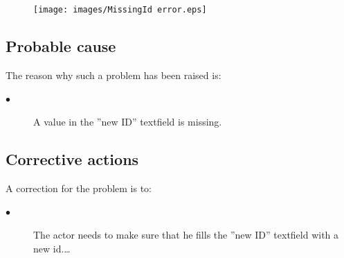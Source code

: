 \begin{figure}[H]
\centering
\texttt{[image: images/MissingId error.eps]}
\caption{\label{overflow}}
\end{figure}
\subsection{Probable cause}

The reason why such a problem has been raised is:\\
\begin{description}
\item[$\bullet$] A value in the ''new ID'' textfield is missing.
\end{description}


\subsection{Corrective actions}

A correction for the problem is to:\\
\begin{description}
\item[$\bullet$] The actor needs to make sure that he fills the
''new ID'' textfield with a new id.\ldots

\end{description}












